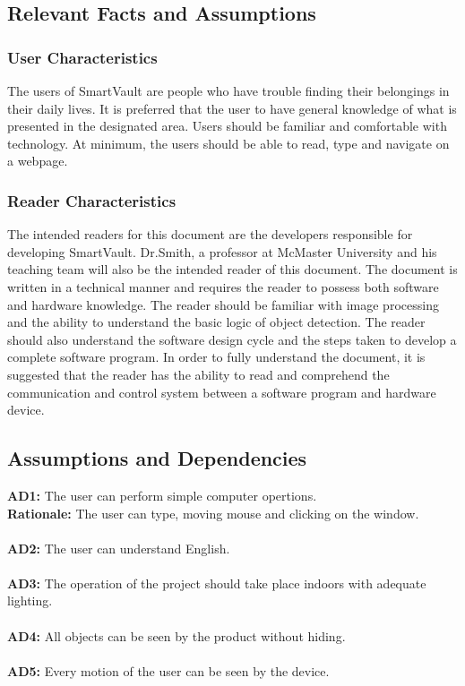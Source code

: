 \documentclass[12pt]{article}
\begin{document}
\subsection{Relevant Facts and Assumptions}




\subsubsection{User Characteristics}
The users of SmartVault are people who have trouble finding their belongings in their daily lives. It is preferred that the user to have general knowledge of what is presented in the designated area. Users should be familiar and comfortable with technology. At minimum, the users should be able to read, type and navigate on a webpage. 
\subsubsection{Reader Characteristics}
The intended readers for this document are the developers responsible for developing SmartVault. Dr.Smith, a professor at McMaster University and his teaching team will also be the intended reader of this document. The document is written in a technical manner and requires the reader to possess both software and hardware knowledge. The reader should be familiar with image processing and the ability to understand the basic logic of object detection. The reader should also understand the software design cycle and the steps taken to develop a complete software program. In order to fully understand the document, it is suggested that the reader has the ability to read and comprehend the communication and control system between a software program and hardware device. 
\subsection{Assumptions and Dependencies}
\textbf{AD1:} The user can perform simple computer opertions.\\
\textbf{Rationale:} The user can type, moving mouse and clicking on the window.\\\\
\textbf{AD2:} The user can understand English.\\\\
\textbf{AD3:} The operation of the project should take place indoors with adequate lighting.\\\\
\textbf{AD4:} All objects can be seen by the product without hiding.\\\\
\textbf{AD5:} Every motion of the user can be seen by the device. 
\end{document}
